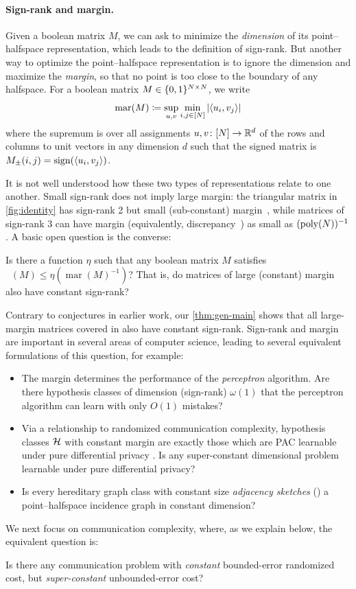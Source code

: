 \documentclass[conference]{IEEEtran}
\DeclareMathOperator{\signrank}{rank_\pm}
\DeclareMathOperator{\margin}{\mathrm{mar}}
\begin{document}
\paragraph{Sign-rank and margin.}
Given a boolean matrix $M$, we can ask to minimize the \emph{dimension} of its
point--halfspace representation, which leads to the definition of sign-rank. But
another way to optimize the point--halfspace representation is to ignore the
dimension and maximize the \emph{margin}, so that no point is too close to the
boundary of any halfspace. For a boolean matrix $M \in \{0,1\}^{N \times N}$, we
write
\[
  \margin(M) \define \sup_{u,v} \min_{i,j \in [N]} |\inn{u_i, v_j}|
\]
where the supremum is over all assignments $u, v \colon [N] \to \mathbb{R}^d$ of the
rows and columns to unit vectors in any dimension $d$ such that the signed
matrix is $M_\pm(i,j) = \operatorname{sign}(\langle u_i,v_j \rangle)$.

It is not well understood how these two types of representations relate to
one another. Small sign-rank does not imply large margin: the triangular matrix in \cref{fig:identity} has sign-rank 2 but small (sub-constant)
margin~\cite{BW16,Vio15,SA23}, while matrices of sign-rank 3 can have margin
(equivalently, discrepancy~\cite{LS09}) as small as $(\operatorname{poly}(N))^{-1}$
\cite{HHL20,ACHS24}. A basic open question is the converse:
\begin{question}
\label{question:intro-main}
Is there a function $\eta$ such that any boolean matrix $M$ satisfies $\signrank(M) \leq \eta(\margin(M)^{-1})$? That is, do matrices of large (constant) margin also have constant sign-rank?
\end{question}
Contrary to conjectures in earlier work, our \cref{thm:gen-main} shows that all large-margin
matrices covered in \cite{FGHH25} also have constant sign-rank. Sign-rank and margin are important in
several areas of computer science, leading to several equivalent formulations of
this question, for example:
\begin{itemize}[itemsep=0pt]
\item The margin determines the performance of the \emph{perceptron} algorithm. Are there hypothesis
classes of dimension (sign-rank) $\omega(1)$ that the perceptron algorithm can learn with only
$O(1)$ mistakes?
\item Via a relationship to randomized communication complexity, hypothesis classes $\mathcal{H}$ with
constant margin are exactly those which are PAC learnable under pure differential privacy \cite{FX14,BNS19}.  Is any
super-constant dimensional problem learnable under pure differential privacy?
\item Is every hereditary graph class with constant size \emph{adjacency sketches}
(\eg \cite{FK09,Har20,HWZ22,EHK22,NP24,AN25}) a point--halfspace incidence graph in constant dimension?
\end{itemize}
We next focus on communication complexity, where, as we explain below, the equivalent question is:
\begin{question}
Is there any communication problem with \emph{constant} bounded-error randomized cost, but
\emph{super-constant} unbounded-error cost?
\end{question}
\end{document}
